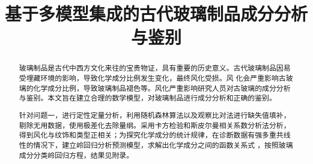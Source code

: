 \documentclass[UTF8]{ctexart}
\title{\textbf{基于多模型集成的古代玻璃制品成分分析与鉴别}}
\date{} %
\begin{document}
\maketitle{}
\renewcommand{\abstractname}{\Large 摘要\\}   %
\begin{abstract}
    \normalsize
    \fontsize{12pt}{18pt}





    玻璃制品是古代中西方文化来往的宝贵物证，具有重要的历史意义。古代玻璃制品因易受埋藏环境的影响，导致化学成分比例发生变化，最终风化受损。风 化会严重影响古玻璃的化学成分比例，导致玻璃制品褪色等。风化严重影响研究人员对古玻璃的成分分析与鉴别。本文旨在建立合理的数学模型，对玻璃制品进行成分分析和正确的鉴别。

    针对问题一，进行定性定量分析，利用随机森林算法以及观察比对法进行缺失值填补，剔除无用数据，使用极差化去除量纲。采用卡方检验和斯皮尔曼相关系数分析法分析，得到风化与纹饰和类型正相关；为探究化学成分的统计规律，在诊断数据有强多重共线性的情况下，建立岭回归分析预测模型，求解出化学成分之间的函数关系式 ，按照玻璃成分分类岭回归方程，结果见附录。


\end{abstract}
\end{document}
